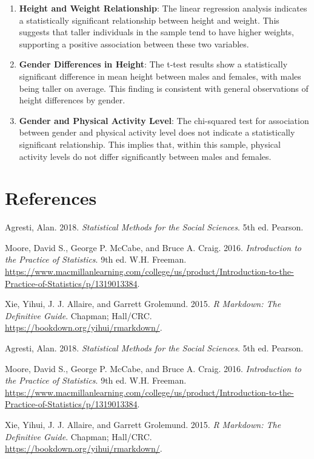 \documentclass[
]{article}
\newlength{\cslhangindent}
\newenvironment{CSLReferences}[2] %
 {\begin{list}{}{%
  \setlength{\itemindent}{0pt}
  \setlength{\leftmargin}{0pt}
  \setlength{\parsep}{0pt}
  \ifodd #1
   \setlength{\leftmargin}{\cslhangindent}
   \setlength{\itemindent}{-1\cslhangindent}
  \fi
  \setlength{\itemsep}{#2\baselineskip}}}
 {\end{list}}
\begin{document}
\begin{enumerate}
\def\labelenumi{\arabic{enumi}.}
\item
  \textbf{Height and Weight Relationship}: The linear regression
  analysis indicates a statistically significant relationship between
  height and weight. This suggests that taller individuals in the sample
  tend to have higher weights, supporting a positive association between
  these two variables.
\item
  \textbf{Gender Differences in Height}: The t-test results show a
  statistically significant difference in mean height between males and
  females, with males being taller on average. This finding is
  consistent with general observations of height differences by gender.
\item
  \textbf{Gender and Physical Activity Level}: The chi-squared test for
  association between gender and physical activity level does not
  indicate a statistically significant relationship. This implies that,
  within this sample, physical activity levels do not differ
  significantly between males and females.
\end{enumerate}

\section*{References}\label{references}

\label{refs}
\begin{CSLReferences}{1}{0}
Agresti, Alan. 2018. \emph{Statistical Methods for the Social Sciences}.
5th ed. Pearson.

Moore, David S., George P. McCabe, and Bruce A. Craig. 2016.
\emph{Introduction to the Practice of Statistics}. 9th ed. W.H. Freeman.
\url{https://www.macmillanlearning.com/college/us/product/Introduction-to-the-Practice-of-Statistics/p/1319013384}.

Xie, Yihui, J. J. Allaire, and Garrett Grolemund. 2015. \emph{R
Markdown: The Definitive Guide}. Chapman; Hall/CRC.
\url{https://bookdown.org/yihui/rmarkdown/}.

Agresti, Alan. 2018. \emph{Statistical Methods for the Social Sciences}.
5th ed. Pearson.

Moore, David S., George P. McCabe, and Bruce A. Craig. 2016.
\emph{Introduction to the Practice of Statistics}. 9th ed. W.H. Freeman.
\url{https://www.macmillanlearning.com/college/us/product/Introduction-to-the-Practice-of-Statistics/p/1319013384}.

Xie, Yihui, J. J. Allaire, and Garrett Grolemund. 2015. \emph{R
Markdown: The Definitive Guide}. Chapman; Hall/CRC.
\url{https://bookdown.org/yihui/rmarkdown/}.

\end{CSLReferences}
\end{document}
